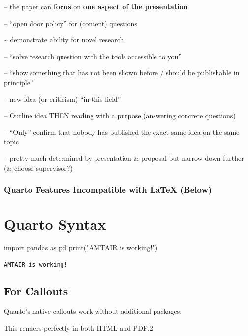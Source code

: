 \documentclass[
  11pt,
  letterpaper,
]{book}
\newenvironment{Shaded}{\begin{snugshade}}{\end{snugshade}}
\newcommand{\BuiltInTok}[1]{\textcolor[rgb]{0.00,0.23,0.31}{#1}}
\newcommand{\ImportTok}[1]{\textcolor[rgb]{0.00,0.46,0.62}{#1}}
\newcommand{\NormalTok}[1]{\textcolor[rgb]{0.00,0.23,0.31}{#1}}
\newcommand{\StringTok}[1]{\textcolor[rgb]{0.13,0.47,0.30}{#1}}
\begin{document}
-- the paper can \textbf{focus} on \textbf{one aspect of the
presentation}

-- ``open door policy'' for (content) questions

\textasciitilde{} demonstrate ability for novel research

-- ``solve research question with the tools accessible to you''

-- ``show something that has not been shown before / should be
publishable in principle''

-- new idea (or criticism) ``in this field''

-- Outline idea THEN reading with a purpose (answering concrete
questions)

-- ``Only'' confirm that nobody has published the exact same idea on the
same topic

-- pretty much determined by presentation \& proposal but narrow down
further (\& choose supervisor?)

\subsection*{Quarto Features Incompatible with LaTeX
(Below)}\label{quarto-features-incompatible-with-latex-below}


\chapter{Quarto Syntax}\label{quarto-syntax}

\begin{Shaded}
\begin{Highlighting}[]
\ImportTok{import}\NormalTok{ pandas }\ImportTok{as}\NormalTok{ pd}
\BuiltInTok{print}\NormalTok{(}\StringTok{"AMTAIR is working!"}\NormalTok{)}
\end{Highlighting}
\end{Shaded}

\begin{verbatim}
AMTAIR is working!
\end{verbatim}

\section{For Callouts}\label{for-callouts}

Quarto's native callouts work without additional packages:

\begin{tcolorbox}[enhanced jigsaw, coltitle=black, bottomtitle=1mm, breakable, toprule=.15mm, colframe=quarto-callout-note-color-frame, opacitybacktitle=0.6, bottomrule=.15mm, left=2mm, colbacktitle=quarto-callout-note-color!10!white, toptitle=1mm, arc=.35mm, title=\textcolor{quarto-callout-note-color}{\faInfo}\hspace{0.5em}{Important Note2}, rightrule=.15mm, titlerule=0mm, leftrule=.75mm, opacityback=0, colback=white]

This renders perfectly in both HTML and PDF.2

\end{tcolorbox}
\end{document}

